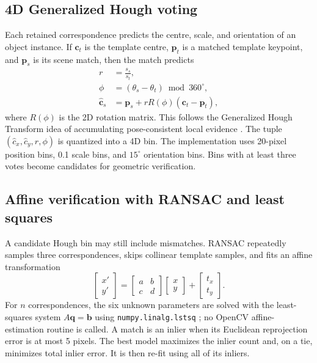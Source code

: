\documentclass[11pt,a4paper]{article}
\begin{document}
\subsection{4D Generalized Hough voting}
Each retained correspondence predicts the centre, scale, and orientation of an object instance. If $\mathbf{c}_t$ is the template centre, $\mathbf{p}_t$ is a matched template keypoint, and $\mathbf{p}_s$ is its scene match, then the match predicts
\begin{align}
    r &= \frac{s_s}{s_t}, \\
    \phi &= (\theta_s - \theta_t) \bmod 360^\circ, \\
    \hat{\mathbf{c}}_s &= \mathbf{p}_s + r R(\phi)(\mathbf{c}_t - \mathbf{p}_t),
\end{align}
where $R(\phi)$ is the 2D rotation matrix. This follows the Generalized Hough Transform idea of accumulating pose-consistent local evidence \cite{ballard1981ght}. The tuple $(\hat{c}_x, \hat{c}_y, r, \phi)$ is quantized into a 4D bin. The implementation uses 20-pixel position bins, 0.1 scale bins, and $15^\circ$ orientation bins. Bins with at least three votes become candidates for geometric verification.

\subsection{Affine verification with RANSAC and least squares}
A candidate Hough bin may still include mismatches. RANSAC \cite{fischler1981ransac} repeatedly samples three correspondences, skips collinear template samples, and fits an affine transformation
\begin{equation}
    \begin{bmatrix}x'\\y'\end{bmatrix} =
    \begin{bmatrix}a & b\\c & d\end{bmatrix}
    \begin{bmatrix}x\\y\end{bmatrix} +
    \begin{bmatrix}t_x\\t_y\end{bmatrix}.
\end{equation}
For $n$ correspondences, the six unknown parameters are solved with the least-squares system $A\mathbf{q}=\mathbf{b}$ using \texttt{numpy.linalg.lstsq} \cite{harris2020numpy}; no OpenCV affine-estimation routine is called. A match is an inlier when its Euclidean reprojection error is at most 5 pixels. The best model maximizes the inlier count and, on a tie, minimizes total inlier error. It is then re-fit using all of its inliers.
\end{document}
